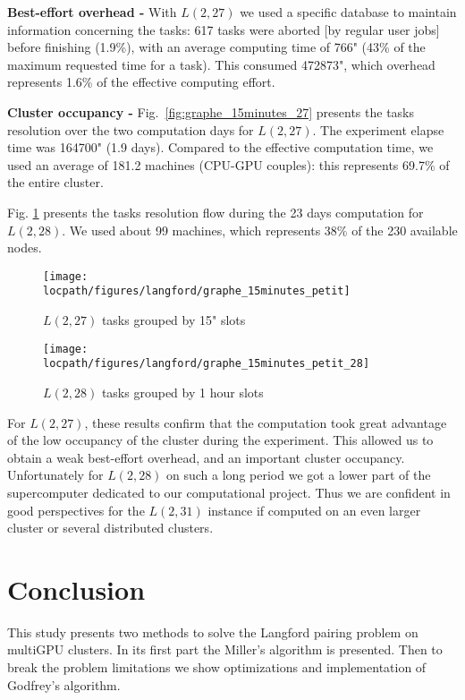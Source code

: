 \textbf{Best-effort overhead -} 
With $L(2,27)$ we used a specific database to maintain information concerning the tasks: 617 tasks were aborted [by regular user jobs] before finishing (1.9\%), with an average computing time of 766" (43\% of the maximum requested time for a task). This consumed 472873", which overhead represents 1.6\% of the effective computing effort.

\textbf{Cluster occupancy -}
Fig.~\ref{fig:graphe_15minutes_27} presents the tasks resolution over the two computation days for $L(2,27)$.
The experiment elapse time was 164700" (1.9 days). Compared to the effective computation time, we used an average of 181.2 machines (CPU-GPU couples): this represents 69.7\% of the entire cluster.
 
Fig. \ref{fig:graphe_15minutes_28} presents the tasks resolution flow during the 23 days computation for $L(2,28)$. We used about 99 machines, which represents 38\% of the 230 available nodes.

\begin{figure}[htb]
\begin{minipage}[b]{0.5\linewidth}
\centering
\texttt{[image: \\locpath/figures/langford/graphe\_15minutes\_petit]}
\caption{$L(2,27)$ tasks grouped by 15" slots}
\label{fig:graphe_15minutes_27}
\end{minipage}
\begin{minipage}[b]{0.5\linewidth}
\centering
\texttt{[image: \\locpath/figures/langford/graphe\_15minutes\_petit\_28]}
\caption{$L(2,28)$ tasks grouped by 1 hour slots}
\label{fig:graphe_15minutes_28}
\end{minipage}
\end{figure}

For $L(2,27)$, these results confirm that the computation took great advantage of the low occupancy of the cluster during the experiment. 
This allowed us to obtain a weak best-effort overhead, and an important cluster occupancy. 
Unfortunately for $L(2,28)$ on such a long period we got a lower part of the supercomputer dedicated to our computational project.
Thus we are confident in good perspectives for the $L(2,31)$ instance if computed on an even larger cluster or several distributed clusters. 

\section{Conclusion}

This study presents two methods to solve the Langford pairing problem on multiGPU clusters. 
In its first part the Miller's algorithm is presented. 
Then to break the problem limitations we show optimizations and implementation of Godfrey's algorithm.

